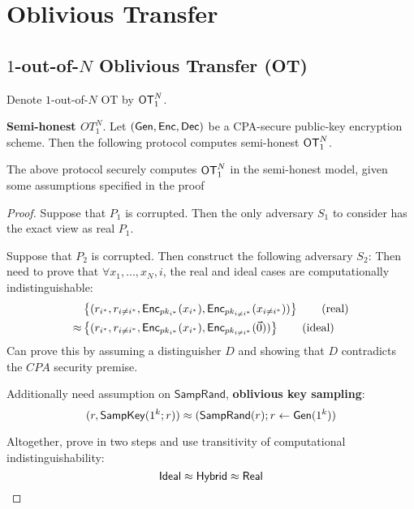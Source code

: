 

\section{Oblivious Transfer}

\subsection{$1$-out-of-$N$ Oblivious Transfer (OT)}

Denote $1$-out-of-$N$ OT by $\mathsf{OT}_1^N$.


\begin{prcl}
\textbf{Semi-honest $OT_1^N$}.
Let $(\mathsf{Gen}, \mathsf{Enc}, \mathsf{Dec})$ be a CPA-secure public-key encryption scheme.
Then the following protocol computes semi-honest $\mathsf{OT}_1^N$.
\end{prcl}

\begin{thm} \label{thm:1N-OT-CPA}
The above protocol securely computes $\mathsf{OT}_1^N$ in the semi-honest model, given some assumptions specified in the proof
\end{thm}
\begin{proof}
Suppose that $P_1$ is corrupted. 
Then the only adversary $S_1$ to consider has the exact view as real $P_1$.

Suppose that $P_2$ is corrupted.
Then construct the following adversary $S_2$:
Then need to prove that $\forall x_1, \dots, x_N, i$, the real and ideal cases are computationally indistinguishable:
\begin{align*}
    &\left\{(r_{i^*}, r_{i \neq i^*}, \mathsf{Enc}_{pk_{i^*}}(x_{i^*}), \mathsf{Enc}_{pk_{i \neq i^*}}(x_{i \neq i^*}))\right\}
    \tag{real}
    \\
    \approx 
    &\left\{(r_{i^*}, r_{i \neq i^*}, \mathsf{Enc}_{pk_{i^*}}(x_{i^*}), \mathsf{Enc}_{pk_{i \neq i^*}}(\vec{0}))\right\}
    \tag{ideal}
\end{align*}
Can prove this by assuming a distinguisher $D$ and showing that $D$ contradicts the $CPA$ security premise.

Additionally need assumption on $\mathsf{SampRand}$, \textbf{oblivious key sampling}:
\[
    (r, \mathsf{SampKey}(1^k; r)) \approx 
    (\mathsf{SampRand}(r); r \gets \mathsf{Gen}(1^k))
\]

Altogether, prove in two steps and use transitivity of computational indistinguishability:
\[
    \mathsf{Ideal} \approx \mathsf{Hybrid} \approx \mathsf{Real} 
\]
\end{proof}

